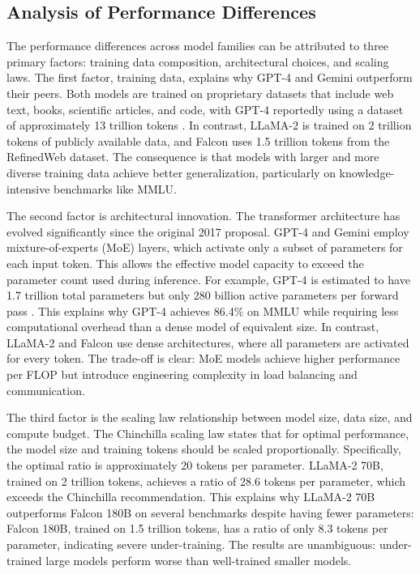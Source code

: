 \documentclass[journal]{IEEEtran}
\begin{document}
\subsection{Analysis of Performance Differences}

The performance differences across model families can be attributed to three primary factors: training data composition, architectural choices, and scaling laws. The first factor, training data, explains why GPT-4 and Gemini outperform their peers. Both models are trained on proprietary datasets that include web text, books, scientific articles, and code, with GPT-4 reportedly using a dataset of approximately 13 trillion tokens \cite{r6}. In contrast, LLaMA-2 is trained on 2 trillion tokens of publicly available data, and Falcon uses 1.5 trillion tokens from the RefinedWeb dataset. The consequence is that models with larger and more diverse training data achieve better generalization, particularly on knowledge-intensive benchmarks like MMLU.

The second factor is architectural innovation. The transformer architecture has evolved significantly since the original 2017 proposal. GPT-4 and Gemini employ mixture-of-experts (MoE) layers, which activate only a subset of parameters for each input token. This allows the effective model capacity to exceed the parameter count used during inference. For example, GPT-4 is estimated to have 1.7 trillion total parameters but only 280 billion active parameters per forward pass \cite{r6}. This explains why GPT-4 achieves 86.4\% on MMLU while requiring less computational overhead than a dense model of equivalent size. In contrast, LLaMA-2 and Falcon use dense architectures, where all parameters are activated for every token. The trade-off is clear: MoE models achieve higher performance per FLOP but introduce engineering complexity in load balancing and communication.

The third factor is the scaling law relationship between model size, data size, and compute budget. The Chinchilla scaling law \cite{r3} states that for optimal performance, the model size and training tokens should be scaled proportionally. Specifically, the optimal ratio is approximately 20 tokens per parameter. LLaMA-2 70B, trained on 2 trillion tokens, achieves a ratio of 28.6 tokens per parameter, which exceeds the Chinchilla recommendation. This explains why LLaMA-2 70B outperforms Falcon 180B on several benchmarks despite having fewer parameters: Falcon 180B, trained on 1.5 trillion tokens, has a ratio of only 8.3 tokens per parameter, indicating severe under-training. The results are unambiguous: under-trained large models perform worse than well-trained smaller models.
\end{document}
